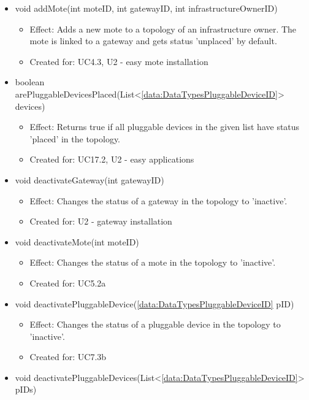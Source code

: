 \begin{description}
\begin{itemize}[noitemsep,nolistsep,leftmargin=-.25cm]
\begin{itemize}
        \end{itemize}
      \item \textsf{void addMote(int moteID, int gatewayID, int infrastructureOwnerID)}
        \begin{itemize}[noitemsep,nolistsep]
           \item Effect: Adds a new mote to a topology of an infrastructure owner. The mote is linked to a gateway and gets status 'unplaced' by default.
\item Created for: UC4.3, U2 - easy mote installation
        \end{itemize}
      \item \textsf{boolean arePluggableDevicesPlaced(List\textless{}\ref{data:DataTypesPluggableDeviceID}\textgreater{} devices)}
        \begin{itemize}[noitemsep,nolistsep]
           \item Effect: Returns true if all pluggable devices in the given list have status 'placed' in the topology.
\item Created for: UC17.2, U2 - easy applications
        \end{itemize}
      \item \textsf{void deactivateGateway(int gatewayID)}
        \begin{itemize}[noitemsep,nolistsep]
           \item Effect: Changes the status of a gateway in the topology to 'inactive'.
\item Created for: U2 - gateway installation
        \end{itemize}
      \item \textsf{void deactivateMote(int moteID)}
        \begin{itemize}[noitemsep,nolistsep]
           \item Effect: Changes the status of a mote in the topology to 'inactive'.
\item Created for: UC5.2a
        \end{itemize}
      \item \textsf{void deactivatePluggableDevice(\ref{data:DataTypesPluggableDeviceID} pID)}
        \begin{itemize}[noitemsep,nolistsep]
           \item Effect: Changes the status of a pluggable device in the topology to 'inactive'.
\item Created for: UC7.3b
        \end{itemize}
      \item \textsf{void deactivatePluggableDevices(List\textless{}\ref{data:DataTypesPluggableDeviceID}\textgreater{} pIDs)}

\end{itemize}
\end{description}
